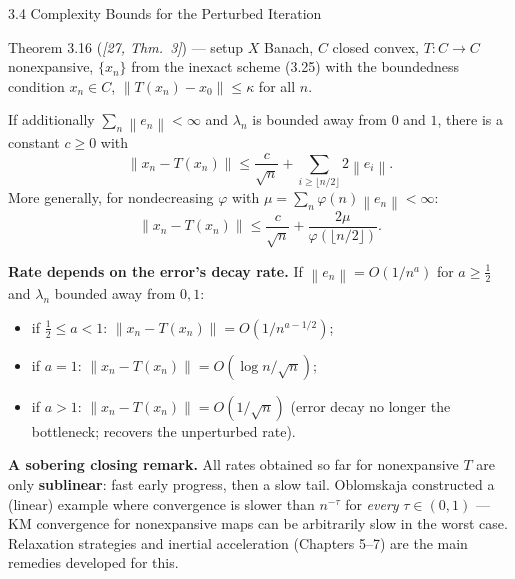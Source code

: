 \documentclass[aspectratio=169,10pt]{beamer}
\newcommand{\norm}[1]{\left\|#1\right\|}
\begin{document}
\begin{frame}[allowframebreaks]{3.4 Complexity Bounds for the Perturbed Iteration}
  \begin{block}{Theorem 3.16 (\emph{[27, Thm.\ 3]}) --- setup}
    $X$ Banach, $C$ closed convex, $T:C\to C$ nonexpansive, $\{x_n\}$
    from the inexact scheme (3.25) with the boundedness condition
    $x_n\in C$, $\norm{T(x_n)-x_0}\le\kappa$ for all $n$.
  \end{block}
  If additionally $\sum_n\norm{e_n}<\infty$ and $\lambda_n$ is bounded
  away from $0$ and $1$, there is a constant $c\ge0$ with
  $$\norm{x_n-T(x_n)}\le\frac{c}{\sqrt n}+\sum_{i\ge\lfloor n/2\rfloor}2\norm{e_i}.$$
  More generally, for nondecreasing $\varphi$ with
  $\mu=\sum_n\varphi(n)\norm{e_n}<\infty$:
  $$\norm{x_n-T(x_n)}\le\frac{c}{\sqrt n}+\frac{2\mu}{\varphi(\lfloor n/2\rfloor)}.$$

  \framebreak

  \textbf{Rate depends on the error's decay rate.} If
  $\norm{e_n}=O(1/n^a)$ for $a\ge\tfrac12$ and $\lambda_n$ bounded away
  from $0,1$:
  \begin{itemize}
    \item if $\tfrac12\le a<1$: $\norm{x_n-T(x_n)}=O(1/n^{a-1/2})$;
    \item if $a=1$: $\norm{x_n-T(x_n)}=O(\log n/\sqrt n)$;
    \item if $a>1$: $\norm{x_n-T(x_n)}=O(1/\sqrt n)$ (error decay no
      longer the bottleneck; recovers the unperturbed rate).
  \end{itemize}

  \textbf{A sobering closing remark.} All rates obtained so far for
  nonexpansive $T$ are only \textbf{sublinear}: fast early progress,
  then a slow tail. Oblomskaja constructed a (linear) example where
  convergence is slower than $n^{-\tau}$ for \emph{every} $\tau\in(0,1)$
  --- KM convergence for nonexpansive maps can be arbitrarily slow in
  the worst case. Relaxation strategies and inertial acceleration
  (Chapters 5--7) are the main remedies developed for this.
\end{frame}
\end{document}
